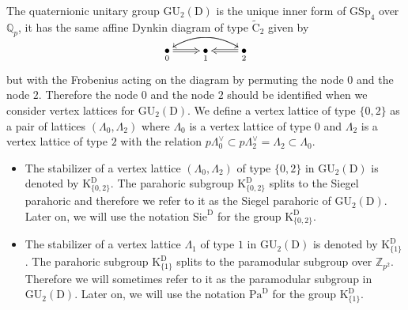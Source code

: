 \documentclass[10pt]{amsart}
\numberwithin{equation}{section}
\theoremstyle{definition}
\def\GSp{\mathrm{GSp}}
\def\GU{\mathrm{GU}}
\def\Sie{\mathrm{Sie}}
\def\QQ{\mathbb{Q}}
\def\ZZ{\mathbb{Z}}
\def\rmC{\mathrm{C}}
\def\rmD{\mathrm{D}}
\def\rmK{\mathrm{K}}
\begin{document}
The quaternionic unitary group $\GU_{2}(\rmD)$ is the unique inner form of $\GSp_{4}$ over $\QQ_{p}$, it has the same affine Dynkin diagram of  type $\widetilde{\rmC}_{2}$  given by
\begin{displaymath}
 \xymatrix{\underset{0}\bullet \ar@/^1pc/[rr]\ar@2{->}[r] &\underset{1}\bullet &\underset{2}\bullet \ar@2{->}[l] \ar@/_1pc/[ll]}
\end{displaymath}
but with the Frobenius acting on the diagram by permuting the node ${0}$ and the node $2$. Therefore the node $0$ and the node $2$ should be identified when we consider vertex lattices for $\GU_{2}(\rmD)$. We define a vertex lattice of type $\{0,2\}$ as a pair of lattices $(\Lambda_{0}, \Lambda_{2})$ where $\Lambda_{0}$ is a vertex lattice of type $0$ and $\Lambda_{2}$ is a vertex lattice of type $2$ with the relation $p\Lambda^{\vee}_{0}\subset p\Lambda^{\vee}_{2}=\Lambda_{2}\subset \Lambda_{0}$. 
\begin{itemize}

\item The stabilizer of a vertex lattice $(\Lambda_{0}, \Lambda_{2})$ of type $\{0, 2\}$ in $\GU_{2}(\rmD)$ is denoted by $\rmK^{\rmD}_{\{0,2\}}$. The parahoric subgroup $\rmK^{\rmD}_{\{0,2\}}$ splits to the Siegel parahoric and therefore we refer to it as the Siegel parahoric of $\GU_{2}(\rmD)$. Later on, we will use the notation $\Sie^{\rmD}$ for the group $\rmK^{\rmD}_{\{0,2\}}$.

\item The stabilizer of a vertex lattice $\Lambda_{1}$ of type $1$ in $\GU_{2}(\rmD)$ is denoted by $\rmK^{\rmD}_{\{1\}}$. The parahoric subgroup $\rmK^{\rmD}_{\{1\}}$ splits to the paramodular subgroup over $\ZZ_{p^{2}}$. Therefore we will sometimes refer to it as  the paramodular subgroup in $\GU_{2}(\rmD)$. Later on, we will use the notation $\mathrm{Pa}^{\rmD}$ for the group  $\rmK^{\rmD}_{\{1\}}$. 
\end{itemize}
\end{document}
